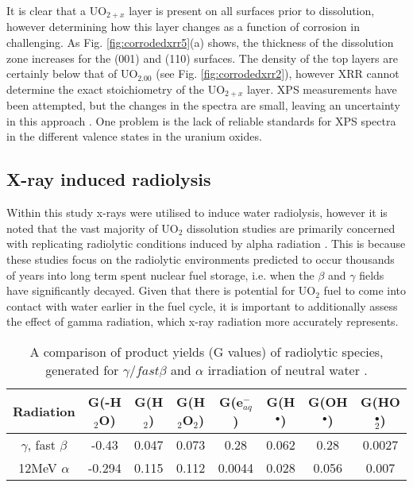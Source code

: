 \documentclass[twocolumn,prl,nobalancelastpage,aps,10pt]{revtex4-1}
\begin{document}
It is clear that a UO$_{2+x}$ layer is present on all surfaces prior to dissolution, however determining how this layer changes as a function of corrosion in challenging. As Fig. \ref{fig:corrodedxrr5}(a) shows, the thickness of the dissolution zone increases for the (001) and (110) surfaces. The density of the top layers are certainly below that of UO$_{2.00}$ (see Fig. \ref{fig:corrodedxrr2}), however XRR cannot determine the exact stoichiometry of the UO$_{2+x}$ layer. XPS measurements have been attempted, but the changes in the spectra are small, leaving an uncertainty in this approach \cite{Rennie2018}. One problem is the lack of reliable standards for XPS spectra in the different valence states in the uranium oxides.

\subsection{X-ray induced radiolysis}
Within this study x-rays were utilised to induce water radiolysis, however it is noted that the vast majority of UO$_2$ dissolution studies are primarily concerned with replicating radiolytic conditions induced by alpha radiation \cite{Shoesmith2000,Sunder2004,Sunder1997,Bailey1985,Wren2005}. This is because these studies focus on the radiolytic environments predicted to occur thousands of years into long term spent nuclear fuel storage, i.e. when the $\beta$ and $\gamma$ fields have significantly decayed. Given that there is potential for UO$_2$ fuel to come into contact with water earlier in the fuel cycle, it is important to additionally assess the effect of gamma radiation, which x-ray radiation more accurately represents.

\begin{table*}
\centering %
{\renewcommand{\arraystretch}{1.5}
\begin{tabular}{c c c c c c c c} %
\hline\hline %
Radiation & G(-H$_2$O) & G(H$_2$) & G(H$_2$O$_2$) & G(e$_{aq}^-$)& G(H$^\bullet$)& G(OH$^\bullet$)& G(HO$_2^\bullet$)\\ [0.5ex] %
\hline %
$\gamma$, fast $\beta$ & -0.43 & 0.047 & 0.073 & 0.28 & 0.062 & 0.28 & 0.0027 \\ %
12MeV $\alpha$ & -0.294 & 0.115 & 0.112 & 0.0044 & 0.028 & 0.056 & 0.007 \\ [1ex]

\hline %
\end{tabular}}
\caption[A comparison of product yields (G values) of radiolytic species, generated for $\gamma / fast \beta$ and $\alpha$ irradiation of neutral water.]{A comparison of product yields (G values) of radiolytic species, generated for $\gamma / fast \beta$ and $\alpha$ irradiation of neutral water \cite{Choppin1995}.} %
\label{table:g_values2}
\end{table*}
\end{document}
